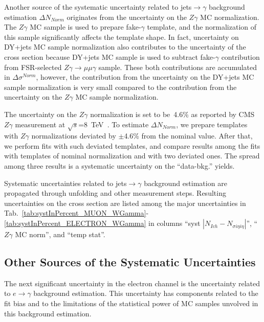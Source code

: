 Another source of the systematic uncertainty related to jets$\rightarrow\gamma$ background estimation $\Delta N_{Norm}$ originates from the  uncertainty on the $Z\gamma$ MC normalization. The $Z\gamma$ MC sample is used to prepare fake-$\gamma$ template, and the normalization of this sample significantly affects the template shape. In fact, uncertainty on DY+jets MC sample normalization also contributes to the uncertainty of the cross section because DY+jets MC sample is used to subtract fake-$\gamma$ contribution from FSR-selected $Z\gamma\rightarrow\mu\mu\gamma$ sample. These both contributions are accumulated in $\Delta \sigma^{Norm}$, however, the contribution from the uncertainty on the DY+jets MC sample normalization is very small compared to the contribution from the uncertainty on the $Z\gamma$ MC sample normalization.  

The uncertainty on the $Z\gamma$ normalization is set to be~4.6\% as reported by CMS $Z\gamma$ measurement at $\sqrt{s}$=8~TeV~\cite{ref_Zg8TeV}. To estimate $\Delta N_{Norm}$, we prepare templates with $Z\gamma$ normalizations deviated by $\pm$4.6\% from the nominal value. After that, we perform fits with such deviated templates, and compare results among the fits with templates of nominal normalization and with two deviated ones. The spread among three results is a systematic uncertainty on the ``data-bkg.'' yields. 

 Systematic uncertainties related to jets$\rightarrow\gamma$ background estimation are propagated through unfolding and other measurement steps. Resulting uncertainties on the cross section are listed among the major uncertainties in Tab.~\ref{tab:systInPercent_MUON_WGamma}-\ref{tab:systInPercent_ELECTRON_WGamma} in columns ``syst $|N_{Ich}-N_{\sigma{i\eta i\eta}}|$'', ``$Z\gamma$ MC norm'', and ``temp stat''.

\subsection{Other Sources of the Systematic Uncertainties}
\label{sec:Systematics_OtherSources}

The next significant uncertainty in the electron channel is the uncertainty related to $e\rightarrow\gamma$ background estimation. This uncertainty has components related to the fit bias and to the limitations of the statistical power of MC samples unvolved in this background estimation. 


